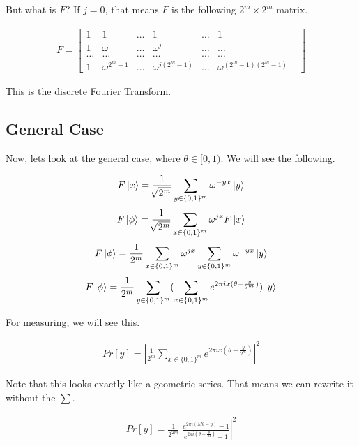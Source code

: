 \documentclass[11pt]{article}
\begin{document}
But what is $F$? If $j = 0$, that means $F$ is the following
$2^m \times 2^m$ matrix.

\begin{align*}
F = 
\begin{bmatrix}
1 & 1 & \dots & 1 & \dots & 1 \\
1 & \omega & \dots & \omega^j & \dots & \dots \\
\dots & \dots & \dots & \dots & \dots & \dots & \\
1 & \omega^{2^m - 1} & \dots & \omega^{j(2^m - 1)} & \dots & \omega^{(2^m - 1)(2^m - 1)}
\end{bmatrix}
\end{align*}

This is the discrete Fourier Transform.

\subsection{General Case}

Now, lets look at the general case, where $\theta \in [0,1)$. We will see the following.

\begin{align*}
F\ket{x} = \frac{1}{\sqrt[]{2^m}}\sum_{y \in \{0,1\}^m} \omega^{-y x} \ket{y}
\end{align*}
\begin{align*}
F\ket{\phi} = \frac{1}{\sqrt[]{2^m}}\sum_{x \in \{0,1\}^m} \omega^{j x} F\ket{x}
\end{align*}
\begin{align*}
F\ket{\phi} = \frac{1}{2^m}\sum_{x \in \{0,1\}^m} \omega^{j x} \sum_{y \in \{0,1\}^m} \omega^{-y x} \ket{y}
\end{align*}
\begin{align*}
F\ket{\phi} = \frac{1}{2^m}\sum_{y \in \{0,1\}^m} (\sum_{x \in \{0,1\}^m} e^{2 \pi i x (\theta - \frac{y}{2^m})} )\ket{y}
\end{align*}

For measuring, we will see this.

\begin{align*}
Pr[y] = \left|\frac{1}{2^m}\sum_{x \in \{0,1\}^m} e^{2 \pi i x (\theta - \frac{y}{2^m})}\right|^2
\end{align*}

Note that this looks exactly like a geometric series. That means we can rewrite it without the $\sum$.

\begin{align*}
Pr[y] = \frac{1}{2^{2m}}|\frac{e^{2 \pi i (M\theta - y)} - 1}{e^{2 \pi i (\theta - \frac{y}{M})} - 1}|^2
\end{align*}
\end{document}
